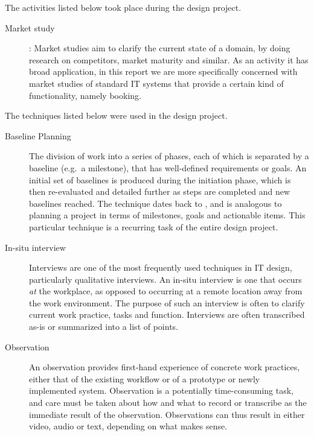 The activities listed below took place during the design project.
\begin{description}
    \item [Market study]: Market studies aim to clarify the current state of a
        domain, by doing research on competitors, market maturity and similar.
        As an activity it has broad application, in this report we are more
        specifically concerned with market studies of standard IT systems that
        provide a certain kind of functionality, namely booking.
\end{description}

The techniques listed below were used in the design project.
\begin{description}
    \item [Baseline Planning] The division of work into a series of phases,
        each of which is separated by a baseline (e.g.\ a milestone), that has well-defined
        requirements or goals. An initial set of baselines is produced during the initiation
        phase, which is then re-evaluated and detailed further as steps are completed and new
        baselines reached. The technique dates back to \cite{andersen1990professional}, and is
        analogous to planning a project in terms of milestones, goals and actionable items. This
        particular technique is a recurring task of the entire design project.

    \item [In-situ interview] Interviews are one of the most frequently used techniques in IT 
        design, particularly qualitative interviews\cite{bodker2004participatory}. An in-situ
        interview is one that occurs \textit{at} the workplace, as opposed to occurring at a
        remote location away from the work environment. The purpose of such an interview is often
        to clarify current work practice, tasks and function. Interviews are often transcribed as-is
        or summarized into a list of points.

    \item [Observation] An observation provides first-hand experience of
        concrete work practices, either that of the existing workflow or of a
        prototype or newly implemented system. Observation is a potentially
        time-consuming task, and care must be taken about how and what to record
        or transcribe as the immediate result of the observation. Observations
        can thus result in either video, audio or text, depending on what makes
        sense.


\end{description}

